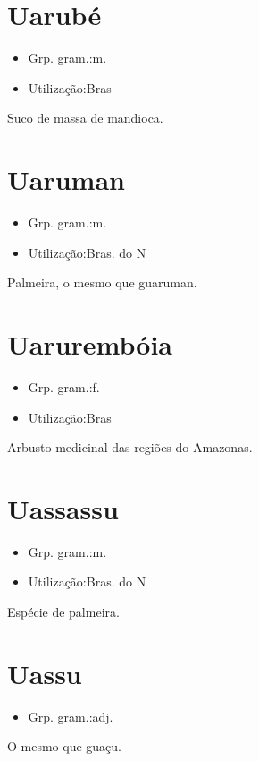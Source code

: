 \documentclass{article}
\begin{document}
\section{Uarubé}
\begin{itemize}
\item {Grp. gram.:m.}
\end{itemize}
\begin{itemize}
\item {Utilização:Bras}
\end{itemize}
Suco de massa de mandioca.
\section{Uaruman}
\begin{itemize}
\item {Grp. gram.:m.}
\end{itemize}
\begin{itemize}
\item {Utilização:Bras. do N}
\end{itemize}
Palmeira, o mesmo que \textunderscore guaruman\textunderscore .
\section{Uarurembóia}
\begin{itemize}
\item {Grp. gram.:f.}
\end{itemize}
\begin{itemize}
\item {Utilização:Bras}
\end{itemize}
Arbusto medicinal das regiões do Amazonas.
\section{Uassassu}
\begin{itemize}
\item {Grp. gram.:m.}
\end{itemize}
\begin{itemize}
\item {Utilização:Bras. do N}
\end{itemize}
Espécie de palmeira.
\section{Uassu}
\begin{itemize}
\item {Grp. gram.:adj.}
\end{itemize}
O mesmo que \textunderscore guaçu\textunderscore .
\end{document}
